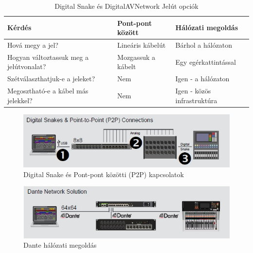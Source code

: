 \begin{table}[htbp]
    \centering
    \caption{Digital Snake és DigitalAVNetwork Jelút opciók}
    \begin{tabular}{@{}lll@{}}
        \toprule
        \textbf{Kérdés} & \textbf{Pont-pont között} & \textbf{Hálózati megoldás} \\ \midrule
        Hová megy a jel? & Lineáris kábelút & Bárhol a hálózaton \\
        Hogyan változtassuk meg a jelútvonalat? & Mozgassuk a kábelt & Egy egérkattintással \\
        Szétválaszthatjuk-e a jeleket? & Nem & Igen - a hálózaton \\
        Megosztható-e a kábel más jelekkel? & Nem & Igen - közös infrastruktúra \\
        \bottomrule
    \end{tabular}
    \label{tab:digital-snake-vs-digitalavnetwork-hu}
\end{table}
\begin{figure}[H]
	\centering
	\includegraphics[width=\linewidth, keepaspectratio]{figures/dsnake-p2p.jpg}
	\caption{Digital Snake és Pont-pont közötti (P2P) kapcsolatok}
	\label {fig:dsnake-p2p}
\end{figure}
\begin{figure}[H]
	\centering
	\includegraphics[width=\linewidth, keepaspectratio]{figures/dante-solution.jpg}
	\caption{Dante hálózati megoldás}
	\label {fig:dante-solution}
\end{figure}


